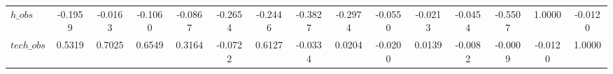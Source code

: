 \begin{center}
\begin{longtable}{lcccccccccccccc}
$h\_obs         $	 & 	          -0.1959	 & 	          -0.0163	 & 	          -0.1060	 & 	          -0.0867	 & 	          -0.2654	 & 	          -0.2446	 & 	          -0.3827	 & 	          -0.2974	 & 	          -0.0550	 & 	          -0.0213	 & 	          -0.0454	 & 	          -0.5507	 & 	           1.0000	 & 	          -0.0120 \\ 
$tech\_obs      $	 & 	           0.5319	 & 	           0.7025	 & 	           0.6549	 & 	           0.3164	 & 	          -0.0722	 & 	           0.6127	 & 	          -0.0334	 & 	           0.0204	 & 	          -0.0200	 & 	           0.0139	 & 	          -0.0082	 & 	          -0.0009	 & 	          -0.0120	 & 	           1.0000 \\ 
\end{longtable}
 \end{center}
